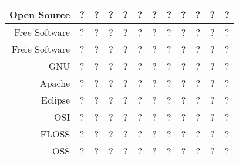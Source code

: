\documentclass[DIV=calc,BCOR=5mm,11pt,headings=small,oneside,abstract=false, toc=bib]{scrartcl}
\begin{document}
\begin{table}
\begin{center}
\begin{tabular}[h]{|r|c|c|c||c|c|c||c|c||c|c|c|}
\hline 
\hline
Open Source
  & ? & ? & ? & ? & ? & ? 
  & ? & ? & ? & ? & ?\\
\hline
Free Software
  & ? & ? & ? & ? & ? & ? 
  & ? & ? & ? & ? & ?\\
\hline
Freie Software
  & ? & ? & ? & ? & ? & ? 
  & ? & ? & ? & ? & ?\\
\hline
GNU
  & ? & ? & ? & ? & ? & ? 
  & ? & ? & ? & ? & ?\\
\hline
Apache
  & ? & ? & ? & ? & ? & ? 
  & ? & ? & ? & ? & ?\\
\hline
Eclipse
  & ? & ? & ? & ? & ? & ? 
  & ? & ? & ? & ? & ?\\
\hline
\hline
OSI
  & ? & ? & ? & ? & ? & ? 
  & ? & ? & ? & ? & ?\\
\hline
FLOSS
  & ? & ? & ? & ? & ? & ? 
  & ? & ? & ? & ? & ?\\
\hline
OSS
  & ? & ? & ? & ? & ? & ?
  & ? & ? & ? & ? & ?\\
\hline
\end{tabular}
\end{center}
\end{table}
\end{document}

